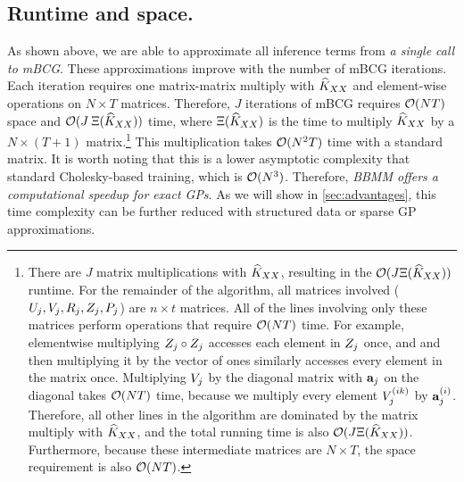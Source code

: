 \subsection{Runtime and space.}
As shown above, we are able to approximate all inference terms from \emph{a single call to mBCG}.
These approximations improve with the number of mBCG iterations.
Each iteration requires one matrix-matrix multiply with $\widehat{K}_{XX}$ and element-wise operations on $N \times T$ matrices.
Therefore, $J$ iterations of mBCG requires $\bigo{NT}$ space and $\bigo{J \: \mmm{\trainK}}$ time,
where $\Xi (\widehat{K}_{XX})$ is the time to multiply $\widehat{K}_{XX}$ by a $N \times (T + 1)$ matrix.\footnote{
	There are $J$ matrix multiplications with $\widehat{K}_{XX}$, resulting in the $\bigo{J \mmm{\trainK}}$ runtime.
	For the remainder of the algorithm, all matrices involved ($U_{j},V_j,R_j,Z_j,P_j$) are $n \times t$ matrices.
	All of the lines involving only these matrices perform operations that require $\bigo{NT}$ time.
	For example, elementwise multiplying $Z_{j} \circ Z_{j}$ accesses each element in $Z_{j}$ once, and and then multiplying it by the vector of ones similarly accesses every element in the matrix once.
	Multiplying $V_{j}$ by the diagonal matrix with $\mathbf{a}_{j}$ on the diagonal takes $\bigo{NT}$ time, because we multiply every element $V_{j}^{(ik)}$ by $\mathbf{a}_{j}^{(i)}$.
	Therefore, all other lines in the algorithm are dominated by the matrix multiply with $\widehat{K}_{XX}$, and the total running time is also $\bigo{J \mmm{\trainK}}$.
	Furthermore, because these intermediate matrices are $N \times T$, the space requirement is also $\bigo{NT}$.
}
This multiplication takes $\bigo{N^2 T}$ time with a standard matrix.
It is worth noting that this is a lower asymptotic complexity that standard Cholesky-based training, which is $\bigo{N^3}$.
Therefore, \emph{BBMM offers a computational speedup for exact GPs}.
As we will show in \cref{sec:advantages}, this time complexity can be further reduced with structured data or sparse GP approximations.


